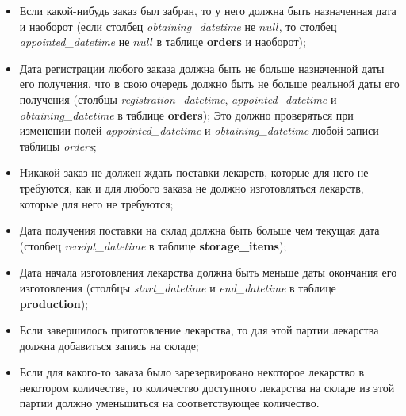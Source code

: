 \documentclass[a4paper]{article}
\newcommand{\dbtable}[1]{\textbf{#1}}
\newcommand{\dbtableref}[1]{\textit{#1}}
\begin{document}
\begin{itemize}
				\item Если какой-нибудь заказ был забран, то у него должна быть назначенная дата и наоборот (если столбец \dbtableref{obtaining\_datetime} не $null$, то столбец \dbtableref{appointed\_datetime} не $null$ в таблице \dbtable{orders} и наоборот);
				
				\item Дата регистрации любого заказа должна быть не больше назначенной даты его получения, что в свою очередь должно быть не больше реальной даты его получения (столбцы \dbtableref{registration\_datetime}, \dbtableref{appointed\_datetime} и \dbtableref{obtaining\_datetime} в таблице \dbtable{orders}); Это должно проверяться при изменении полей \dbtableref{appointed\_datetime} и \dbtableref{obtaining\_datetime} любой записи таблицы \dbtableref{orders};
				
				\item Никакой заказ не должен ждать поставки лекарств, которые для него не требуются, как и для любого заказа не должно изготовляться лекарств, которые для него не требуются;
					
				\item Дата получения поставки на склад должна быть больше чем текущая дата (столбец \dbtableref{receipt\_datetime} в таблице \dbtable{storage\_items});
				
				\item Дата начала изготовления лекарства должна быть меньше даты окончания его изготовления (столбцы \dbtableref{start\_datetime} и \dbtableref{end\_datetime} в таблице \dbtable{production});
				
				\item Если завершилось приготовление лекарства, то для этой партии лекарства должна добавиться запись на складе;
			
				\item Если для какого-то заказа было зарезервировано некоторое лекарство в некотором количестве, то количество доступного лекарства на складе из этой партии должно уменьшиться на соответствующее количество.
			\end{itemize}
	\newpage
\end{document}
